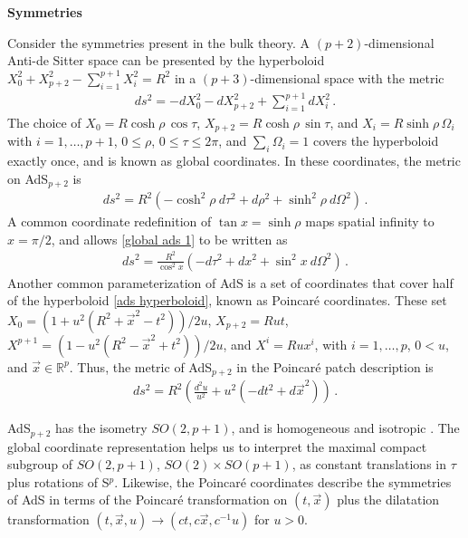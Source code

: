 \documentclass[../PhD.tex]{subfiles}
\begin{document}
{\bf Symmetries}

Consider the symmetries present in the \ads bulk theory. A $(p+2)$-dimensional Anti-de Sitter space can be presented by the hyperboloid $X_0^2 + X^2_{p+2} - \sum^{p+1}_{i=1} X_i^2 = R^2$ in a $(p+3)$-dimensional space with the metric
\begin{align}
\label{ads hyperboloid}
ds^2 = -dX_0^2 - dX_{p+2}^2 + \sum^{p+1}_{i = 1} dX^2_i \, .
\end{align}
The choice of {$X_0 = R \cosh \rho \, \cos \tau$}, {$X_{p+2} = R\cosh \rho \,\sin \tau$}, and {$X_i = R \sinh \rho \,\Omega_i$} with $i=1,\ldots,p + 1$, $0 \leq \rho$, $0 \leq \tau \leq 2\pi$, and $\sum_i \Omega_i = 1$ covers the hyperboloid exactly once, and is known as global coordinates. In these coordinates, the metric on AdS$_{p+2}$ is
\begin{align}
\label{global ads 1}
ds^2 = R^2 \left( - \cosh^2 \rho~d\tau^2 + d \rho^2 + \sinh^2 \rho~d\Omega^2 \right) \, .
\end{align}
A common coordinate redefinition of $\tan x = \sinh \rho$ maps spatial infinity to $x = \pi / 2$, and allows \eqref{global ads 1} to be written as
\begin{align}
\label{global ads 2}
ds^2 = \frac{R^2}{\cos^2 x} \left( - d\tau^2 + dx^2 + \sin^2 x~d\Omega^2 \right) \, .
\end{align}
Another common parameterization of AdS is a set of coordinates that cover half of the hyperboloid \eqref{ads hyperboloid}, known as Poincar\'e coordinates. These set {$X_0 = (1 + u^2 (R^2 + {\vec x}^2 - t^2) )/2u$}, {$X_{p+2} = Ru t$}, {$X^{p+1} = ( 1 - u^2 (R^2 - {\vec x}^2 + t^2) )/ 2u$}, and {$X^i = Rux^i$}, with {$i = 1, \ldots, p$}, {$0 < u$}, and {$\vec x \in \mathbb{R}^p$}. Thus, the metric of AdS$_{p+2}$ in the Poincar\'e patch description is
\begin{align}
\label{poincare ads}
ds^2 = R^2 \left( \frac{d^2u}{u^2} + u^2 (- dt^2 + d {\vec x}^2) \right) \, .
\end{align}

AdS$_{p+2}$ has the isometry $SO(2,p+1)$, and is homogeneous and isotropic \cite{hep-th/9905111}. The global coordinate representation helps us to interpret the maximal compact subgroup of $SO(2, p+1)$, $SO(2)\times SO(p+1)$, as constant translations in $\tau$ plus rotations of S$^p$. Likewise, the Poincar\'e coordinates describe the symmetries of AdS in terms of the Poincar\'e transformation on $(t, \vec x)$ plus the dilatation transformation {$(t, \vec x, u) \to (ct, c \vec x, c^{-1}u)$} for $u >0$.
\end{document}
